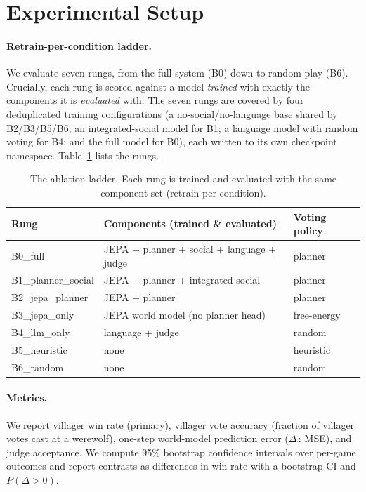 \documentclass[11pt]{article}
\begin{document}
\section{Experimental Setup}
\label{sec:setup}
\paragraph{Retrain-per-condition ladder.} We evaluate seven rungs, from the full
system (B0) down to random play (B6). Crucially, each rung is scored against a
model \emph{trained} with exactly the components it is \emph{evaluated} with. The
seven rungs are covered by four deduplicated training configurations (a
no-social/no-language base shared by B2/B3/B5/B6; an integrated-social model for
B1; a language model with random voting for B4; and the full model for B0), each
written to its own checkpoint namespace. Table~\ref{tab:rungs} lists the rungs.

\begin{table}[t]
\centering
\small
\begin{tabular}{lll}
\toprule
Rung & Components (trained \& evaluated) & Voting policy \\
\midrule
B0\_full            & JEPA + planner + social + language + judge & planner \\
B1\_planner\_social & JEPA + planner + integrated social         & planner \\
B2\_jepa\_planner   & JEPA + planner                             & planner \\
B3\_jepa\_only      & JEPA world model (no planner head)         & free-energy \\
B4\_llm\_only       & language + judge                           & random \\
B5\_heuristic       & none                                       & heuristic \\
B6\_random          & none                                       & random \\
\bottomrule
\end{tabular}
\caption{The ablation ladder. Each rung is trained and evaluated with the same
component set (retrain-per-condition).}
\label{tab:rungs}
\end{table}

\paragraph{Metrics.} We report villager win rate (primary), villager vote accuracy
(fraction of villager votes cast at a werewolf), one-step world-model prediction
error ($\Delta z$ MSE), and judge acceptance. We compute 95\%
bootstrap confidence intervals over per-game outcomes and report contrasts as
differences in win rate with a bootstrap CI and $P(\Delta>0)$.
\end{document}
